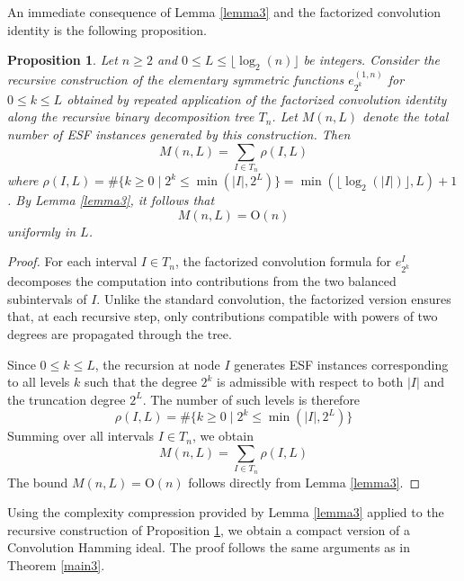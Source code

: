 \documentclass{amsart}
\newtheorem{proposition}[theorem]{Proposition}
\def\cO{{\mathrm{O}}}
\begin{document}
An immediate consequence of Lemma \ref{lemma3} and the factorized convolution identity is
the following proposition.

\begin{proposition}
\label{main4}
Let $n\geq 2$ and $0\leq L\leq \lfloor \log_2(n) \rfloor$ be integers. Consider the recursive
construction of the elementary symmetric functions $e_{2^k}^{(1,n)}$ for $0\leq k \leq L$
obtained by repeated application of the factorized convolution identity along the recursive
binary decomposition tree $T_n$. Let $M(n,L)$ denote the total number of ESF instances
generated by this construction. Then
\[
M(n,L) = \sum_{I\in T_n} \rho(I,L)
\]
where $\rho(I,L) = \# \{k\geq 0 \mid 2^k \leq \min(|I|,2^L)\} =
\min(\lfloor \log_2(|I|) \rfloor, L) + 1$. By Lemma \ref{lemma3}, it follows that
\[
M(n,L) = \cO(n)
\]
uniformly in $L$.
\end{proposition}

\begin{proof}
For each interval $I\in T_n$, the factorized convolution formula for $e_{2^k}^I$
decomposes the computation into contributions from the two balanced subintervals of $I$.
Unlike the standard convolution, the factorized version ensures that, at each recursive step,
only contributions compatible with powers of two degrees are propagated through the tree.

Since $0\leq k\leq L$, the recursion at node $I$ generates ESF instances corresponding to all
levels $k$ such that the degree $2^k$ is admissible with respect to both $|I|$ and the
truncation degree $2^L$. The number of such levels is therefore
\[
\rho(I,L) = \# \{k\geq 0 \mid 2^k \leq \min(|I|,2^L)\}
\]
Summing over all intervals $I\in T_n$, we obtain
\[
M(n,L) = \sum_{I\in T_n} \rho(I,L)
\]
The bound $M(n,L) = \cO(n)$ follows directly from Lemma \ref{lemma3}.
\end{proof}

Using the complexity compression provided by Lemma \ref{lemma3} applied to the recursive
construction of Proposition \ref{main4}, we obtain a compact version of a Convolution
Hamming ideal. The proof follows the same arguments as in Theorem \ref{main3}.
\end{document}
